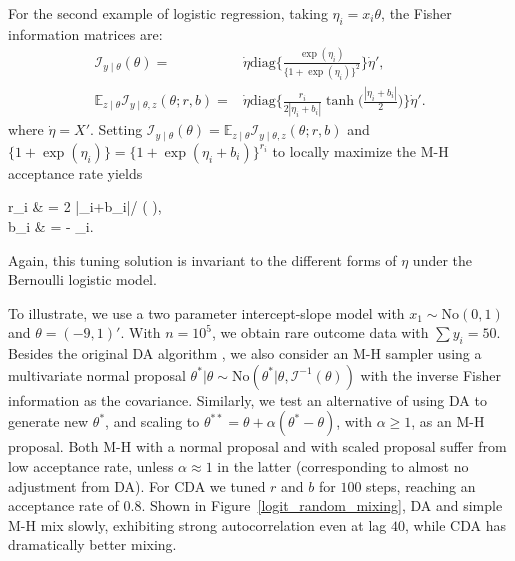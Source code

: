 \documentclass[11pt]{article}
\newcommand{\be}{\begin{equs}}
\newcommand{\ee}{\end{equs}}
\newcommand{\bb}[1]{\mathbb{#1}}
\newcommand{\mc}[1]{\mathcal{#1}}
\newcommand{\No}{\text{No}}
\newcommand{\diag}{\text{diag}}
\begin{document}
 
For the second example of logistic regression, taking $\eta_i=x_i\theta$, the Fisher information matrices
are:
 \begin{eqnarray}
\mc I_{y\mid \theta}({\theta}) =&  \dot\eta \diag\bigg\{\frac{\exp(\eta_i)}{ \{1+\exp(\eta_i)\} ^2}\bigg\} \dot\eta', \nonumber \\
\bb E_{z\mid \theta}\mc I_{y\mid \theta,z}({\theta};r,b)= & \dot\eta  \diag\bigg\{ \frac{r_i}{2 |\eta_i+b_i|}\tanh\Big(\frac{|\eta_i+b_i|}{2} \Big)\bigg\} \dot\eta' .  \nonumber
\end{eqnarray}
where $\dot\eta=X'$. 
Setting $\mc I_{y\mid \theta}({\theta})=\bb E_{z\mid \theta}\mc I_{y\mid \theta,z}({\theta};r,b)$ and $ \{1+\exp(\eta_i)\}  = \{1+\exp(\eta_i+b_i)\}^{r_i}$
to locally maximize the M-H acceptance rate yields
\be
r_i & = {2 |\eta_i+b_i|}/ \tanh\Big( \Big),
\\ b_i & =  - \eta_i.
\ee
{Again, this tuning solution is invariant to the different forms of $\eta$ under
the Bernoulli logistic model.}

To illustrate, we use a two parameter intercept-slope model with $x_1\sim \No(0,1)$ and $\theta=(-9,1)'$. With $n= 10^5$, we obtain rare outcome data with 
$\sum y_{i} = 50 $.  Besides the original DA algorithm  \citep{polson2013bayesian}, we also consider an M-H sampler using a multivariate normal proposal $\theta^*|\theta \sim \No(\theta^*| \theta, {\mc I}^{-1}(\theta))$ with the inverse Fisher information as the covariance. {Similarly, we test an alternative of using DA to generate new $\theta^*$, and scaling to $\theta^{**}=\theta+\alpha(\theta^{*}-\theta)$, with $\alpha\ge 1$, as an M-H proposal. Both M-H with a normal proposal and with scaled proposal suffer from low acceptance rate, unless $\alpha\approx 1$ in the latter (corresponding to almost no adjustment from DA).} For CDA we tuned $r$ and $b$ for $100$ steps, reaching an acceptance rate of $0.8$.  Shown in Figure~\ref{logit_random_mixing}, DA and simple M-H mix slowly, exhibiting strong autocorrelation even at lag $40$, while CDA has dramatically better mixing.
\end{document}
